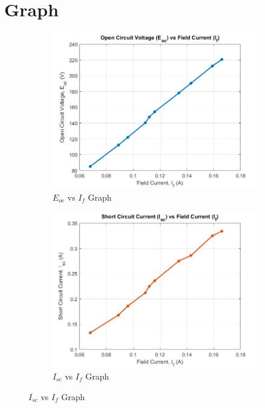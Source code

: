 \documentclass[a4paper,12pt]{article}
\begin{document}
		
\section{Graph}
\begin{figure}[H]
	\centering
	\begin{subfigure}[t]{1\textwidth}
		\centering
		\includegraphics[width=.94\linewidth]{Images/1}
		\caption{$E_{oc}$ vs $I_f$ Graph }
		
	\end{subfigure}
	
	\begin{subfigure}[t]{1\textwidth}
		\centering
		\includegraphics[width=.94\linewidth]{Images/2}
		\caption{ $I_{sc}$ vs $I_f$ Graph}
	\end{subfigure}
	
	
\end{figure}
\end{document}
